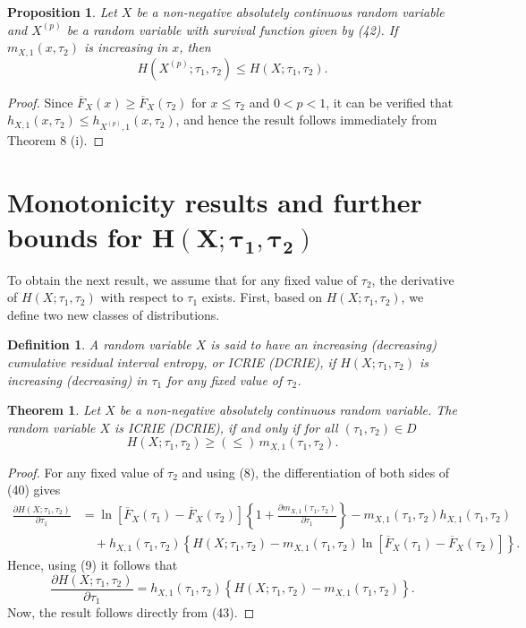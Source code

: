 \documentclass[11pt]{article}
\newtheorem{theorem}{Theorem}
\newtheorem{proposition}{Proposition}
\newtheorem{definition}{Definition}
\begin{document}
 
\begin{proposition} 
	Let $X$ be a non-negative absolutely continuous random variable and $X^{(p)}$ be a random variable with survival function given by (42). If $m_{X,1}(x,\tau_2)$ is increasing in $x$, then
	$$ H(X^{(p)};\tau_1,\tau_2) \leq H(X;\tau_1,\tau_2). $$
\end{proposition}

\begin{proof}
	Since $\overline{F}_X(x) \geq \overline{F}_X(\tau_2)$ for $x \leq \tau_2$ and $0 < p < 1$, it can be verified that $h_{X,1}(x,\tau_2) \leq h_{X^{(p)},1}(x,\tau_2)$, and hence the result follows immediately from Theorem 8 (i).
\end{proof}

\section{Monotonicity results and further bounds for $\boldsymbol{H(X;\tau_1,\tau_2)}$} \label{sec5}

To obtain the next result, we assume that for any fixed value of $\tau_2$, the derivative of $H(X;\tau_1,\tau_2)$ with respect to $\tau_1$ exists. First, based on $H(X;\tau_1,\tau_2)$, we define two new classes of distributions.

\begin{definition}
	A random variable $X$ is said to have an increasing (decreasing) cumulative residual interval entropy, or ICRIE (DCRIE), if $H(X;\tau_1,\tau_2)$ is increasing (decreasing) in $\tau_1$ for any fixed value of $\tau_2$.
\end{definition}

\begin{theorem}
	Let $X$ be a non-negative absolutely continuous random variable. The random variable $X$ is ICRIE (DCRIE), if and only if for all $(\tau_1,\tau_2)\in D$
	$$ \textstyle H(X;\tau_1,\tau_2) \geq (\leq) \, m_{X,1}(\tau_1,\tau_2). $$ 
\end{theorem}

\begin{proof}
	For any fixed value of $\tau_2$ and using (8), the differentiation of both sides of (40) gives
	\begin{align*}
		\textstyle \frac{\partial H(X;\tau_1,\tau_2)}{\partial \tau_1} & = \textstyle \ln[\overline{F}_X(\tau_1) - \overline{F}_X(\tau_2)]\left\{1 + \frac{\partial m_{X,1}(\tau_1,\tau_2)}{\partial \tau_1}\right\} - m_{X,1}(\tau_1,\tau_2) h_{X,1}(\tau_1,\tau_2) \\
		& \quad + h_{X,1}(\tau_1,\tau_2)\left\{H(X;\tau_1,\tau_2) - m_{X,1}(\tau_1,\tau_2)\ln[\overline{F}_X(\tau_1) - \overline{F}_X(\tau_2)]\right\}.
	\end{align*}
	Hence, using (9) it follows that
	\begin{equation}
		\textstyle \frac{\partial H(X;\tau_1,\tau_2)}{\partial \tau_1} = h_{X,1}(\tau_1,\tau_2)\left\{H(X;\tau_1,\tau_2) - m_{X,1}(\tau_1,\tau_2)\right\}.
	\end{equation}
	Now, the result follows directly from (43).
\end{proof}
\end{document}
